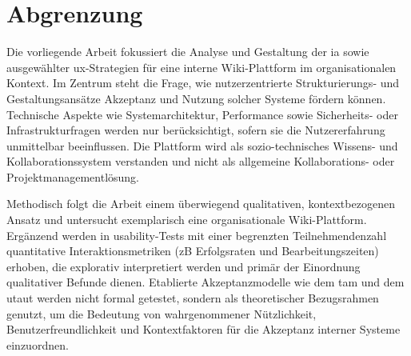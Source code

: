 \section{Abgrenzung}
\label{sec:01-04_scope}

Die vorliegende Arbeit fokussiert die Analyse und Gestaltung der \Gls{ia} sowie ausgewählter \Gls{ux}-Strategien für eine interne Wiki-Plattform im organisationalen Kontext. Im Zentrum steht die Frage, wie nutzerzentrierte Strukturierungs- und Gestaltungsansätze Akzeptanz und Nutzung solcher Systeme fördern können. Technische Aspekte wie Systemarchitektur, Performance sowie Sicherheits- oder Infrastrukturfragen werden nur berücksichtigt, sofern sie die Nutzererfahrung unmittelbar beeinflussen. Die Plattform wird als sozio-technisches Wissens- und Kollaborationssystem verstanden und nicht als allgemeine Kollaborations- oder Projektmanagementlösung.

Methodisch folgt die Arbeit einem überwiegend qualitativen, kontextbezogenen Ansatz und untersucht exemplarisch eine organisationale Wiki-Plattform. Ergänzend werden in \Gls{usability}-Tests mit einer begrenzten Teilnehmendenzahl quantitative Interaktionsmetriken (\acrshort{zB} Erfolgsraten und Bearbeitungszeiten) erhoben, die explorativ interpretiert werden und primär der Einordnung qualitativer Befunde dienen. Etablierte Akzeptanzmodelle wie dem \acrshort{tam} und dem \acrshort{utaut} werden nicht formal getestet, sondern als theoretischer Bezugsrahmen genutzt, um die Bedeutung von wahrgenommener Nützlichkeit, Benutzerfreundlichkeit und Kontextfaktoren für die Akzeptanz interner Systeme einzuordnen.
